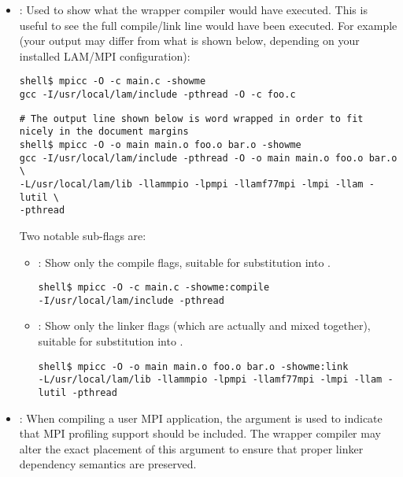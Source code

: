 \begin{itemize}
\item {}: Used to show what the wrapper compiler would
  have executed.  This is useful to see the full compile/link line
  would have been executed.  For example (your output may differ from
  what is shown below, depending on your installed LAM/MPI
  configuration):

  \lstset{style=lam-cmdline}
  \begin{lstlisting}
shell$ mpicc -O -c main.c -showme
gcc -I/usr/local/lam/include -pthread -O -c foo.c
  \end{lstlisting}
  \lstset{style=lam-cmdline}
  \begin{lstlisting}
# The output line shown below is word wrapped in order to fit nicely in the document margins
shell$ mpicc -O -o main main.o foo.o bar.o -showme
gcc -I/usr/local/lam/include -pthread -O -o main main.o foo.o bar.o \
-L/usr/local/lam/lib -llammpio -lpmpi -llamf77mpi -lmpi -llam -lutil \
-pthread 
  \end{lstlisting}


  Two notable sub-flags are:

  \begin{itemize}
  \item {}: Show only the compile flags,
    suitable for substitution into .
    
  \lstset{style=lam-cmdline}
  \begin{lstlisting}
shell$ mpicc -O -c main.c -showme:compile
-I/usr/local/lam/include -pthread
  \end{lstlisting}

  \item {}: Show only the linker flags (which are
    actually  and  mixed together),
    suitable for substitution into \envvar{LIBS}.

  \lstset{style=lam-cmdline}
  \begin{lstlisting}
shell$ mpicc -O -o main main.o foo.o bar.o -showme:link
-L/usr/local/lam/lib -llammpio -lpmpi -llamf77mpi -lmpi -llam -lutil -pthread 
  \end{lstlisting}

  \end{itemize}


\item {}: When compiling a user MPI application, the
   argument is used to indicate that MPI profiling
  support should be included.  The wrapper compiler may alter the
  exact placement of this argument to ensure that proper linker
  dependency semantics are preserved.
\end{itemize}

